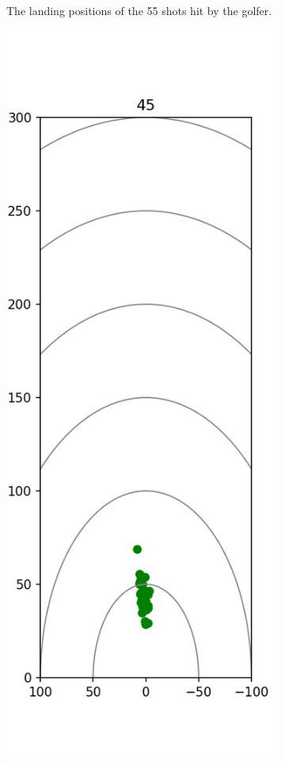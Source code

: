\documentclass{kththesis}
\begin{document}
\begin{figure}
\begin{subfigure}{0.4\textwidth}
    \caption{The landing positions of the 55 shots hit by the golfer.}
    \label{fig:55_shots}
    \end{subfigure}
    \begin{subfigure}{0.4\textwidth}
    \centering
    \includegraphics[height=0.4\textheight]{Shots/45_shots.png} 

\end{subfigure}
\end{figure}
\end{document}

